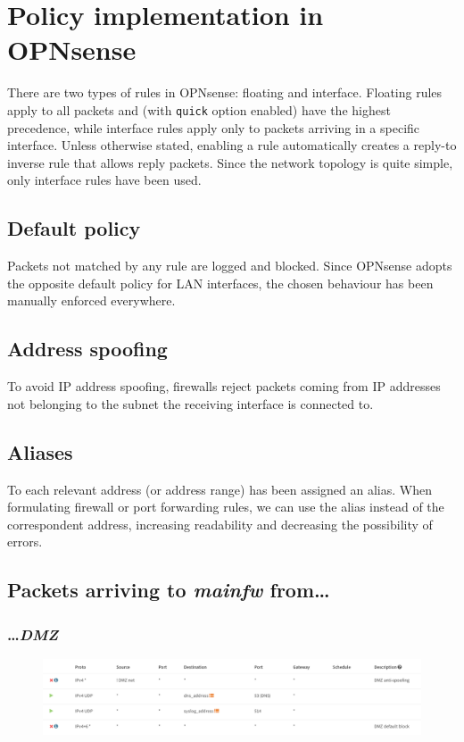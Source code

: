 \documentclass[draft]{homework}
\newcommand{\opn}{OPNsense\xspace}
\newcommand{\dmz}{\textit{DMZ}\xspace}
\newcommand{\mainfw}{\textit{mainfw}\xspace}
\begin{document}
    
    \section{Policy implementation in \opn}
    There are two types of rules in \opn: floating and interface.
    Floating rules apply to all packets and (with \texttt{quick} option enabled) have the highest precedence, while interface rules apply only to packets arriving in a specific interface.
    Unless otherwise stated, enabling a rule automatically creates a reply-to inverse rule that allows reply packets.
    Since the network topology is quite simple, only interface rules have been used.
    
    \subsection{Default policy}
    Packets not matched by any rule are logged and blocked.
    Since \opn adopts the opposite default policy for LAN interfaces, the chosen behaviour has been manually enforced everywhere.
    
    \subsection{Address spoofing}
    To avoid IP address spoofing, firewalls reject packets coming from IP addresses not belonging to the subnet the receiving interface is connected to.
    
    \subsection{Aliases}
    To each relevant address (or address range) has been assigned an alias.
    When formulating firewall or port forwarding rules, we can use the alias instead of the correspondent address, increasing readability and decreasing the possibility of errors.
    
    \subsection{Packets arriving to \mainfw from\dots}
    \subsubsection{\dots \dmz}
    \begin{figure}[H]
        \centering
        \includegraphics[width=\linewidth]{images/mainfw-DMZ}
        \label{fig:mainfw-dmz}
    \end{figure}
    
\end{document}
